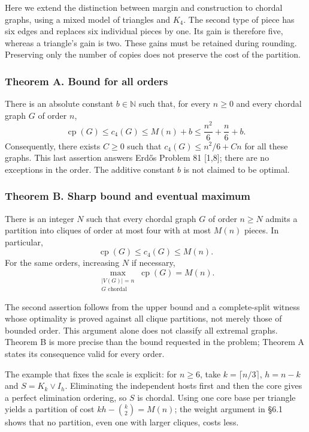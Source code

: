 \documentclass[english,11pt,a4paper]{article}
\begin{document}
Here we extend the distinction between margin and construction to chordal graphs, using a mixed model of triangles and \(K_4\). The second type of piece has six edges and replaces six individual pieces by one. Its gain is therefore five, whereas a triangle's gain is two. These gains must be retained during rounding. Preserving only the number of copies does not preserve the cost of the partition.

\subsubsection{Theorem A. Bound for all orders}\label{theorem-a.-bound-for-all-orders}

There is an absolute constant \(b\in\mathbb N\) such that, for every \(n\ge0\) and every chordal graph \(G\) of order \(n\), \[
\operatorname{cp}(G)\le c_4(G)\le M(n)+b
\le\frac{n^2}{6}+\frac n6+b.
\tag{A}
\] Consequently, there exists \(C\ge0\) such that \(c_4(G)\le n^2/6+Cn\) for all these graphs. This last assertion answers Erdős Problem 81 {[}1,8{]}; there are no exceptions in the order. The additive constant \(b\) is not claimed to be optimal.

\subsubsection{Theorem B. Sharp bound and eventual maximum}\label{theorem-b.-sharp-bound-and-eventual-maximum}

There is an integer \(N\) such that every chordal graph \(G\) of order \(n\ge N\) admits a partition into cliques of order at most four with at most \(M(n)\) pieces. In particular, \[
\operatorname{cp}(G)\le c_4(G)\le M(n).
\tag{1.1}
\] For the same orders, increasing \(N\) if necessary, \[
\max_{\substack{|V(G)|=n\\G\text{ chordal}}}\operatorname{cp}(G)=M(n).
\tag{1.2}
\]

The second assertion follows from the upper bound and a complete-split witness whose optimality is proved against all clique partitions, not merely those of bounded order. This argument alone does not classify all extremal graphs. Theorem B is more precise than the bound requested in the problem; Theorem A states its consequence valid for every order.

The example that fixes the scale is explicit: for \(n\ge6\), take \(k=\lceil n/3\rceil\), \(h=n-k\) and \(S=K_k\vee I_h\). Eliminating the independent hosts first and then the core gives a perfect elimination ordering, so \(S\) is chordal. Using one core base per triangle yields a partition of cost \(kh-\binom k2=M(n)\); the weight argument in §6.1 shows that no partition, even one with larger cliques, costs less.
\end{document}
